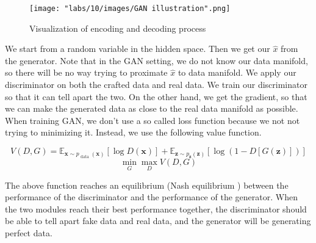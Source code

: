 \begin{figure}
    \centering
    \texttt{[image: "labs/10/images/GAN illustration".png]}
    \caption{Visualization of encoding and decoding process}
    \label{fig:my_label}
\end{figure}

We start from a random variable in the hidden space. Then we get our $\hat{x}$ from the generator. Note that in the GAN setting, we do not know our data manifold, so there will be no way trying to proximate $\hat{x}$ to data manifold. We apply our discriminator on both the crafted data and real data. We train our discriminator so that it can tell apart the two. On the other hand, we get the gradient, so that we can make the generated data as close to the real data manifold as possible. \\ 


When training GAN, we don't use a so called loss function because we not not trying to minimizing it. Instead, we use the following value function.

$$V(D, G)=\mathbb{E}_{\boldsymbol{x} \sim p_{\text { data }}(\boldsymbol{x})}[\log D(\boldsymbol{x})]+\mathbb{E}_{\boldsymbol{z} \sim p_{\boldsymbol{z}}(\boldsymbol{z})}[\log (1-D[G(\boldsymbol{z})])]$$
$$\min _{G} \max _{D} V(D, G)$$

The above function reaches an equilibrium (Nash equilibrium ) between the performance of the discriminator and the performance of the generator. When the two modules reach their best performance together, the discriminator should be able to tell apart fake data and real data, and the generator will be generating perfect data.